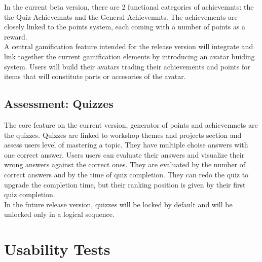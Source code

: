 In the current beta version, there are 2 functional categories of achievemnts: the the Quiz Achievemnts and the General Achievemnts. The achievements are closely linked to the points system, each coming with a number of points as a reward.\\

A central gamification feature intended for the release version will integrate and link together the current gamification elements by introducing an avatar buiding system. Users will build their avatars trading their achievements and points for items that will constitute parts or accesories of the avatar.

\subsection{Assessment: Quizzes}

The core feature on the current version, generator of points and achievemnets are the quizzes. Quizzes are linked to workshop themes and projects section and assess users level of mastering a topic. They have multiple choise answers with one correct answer. Users users can evaluate their answers and visualize their wrong answers against the correct ones. They are evaluated by the number of correct answers and by the time of quiz completion. They can redo the quiz to upgrade the completion time, but their ranking position is given by their first quiz completion. \\

In the future release version, quizzes will be locked by default and will be unlocked only in a logical sequence. 


\section{Usability Tests}




















